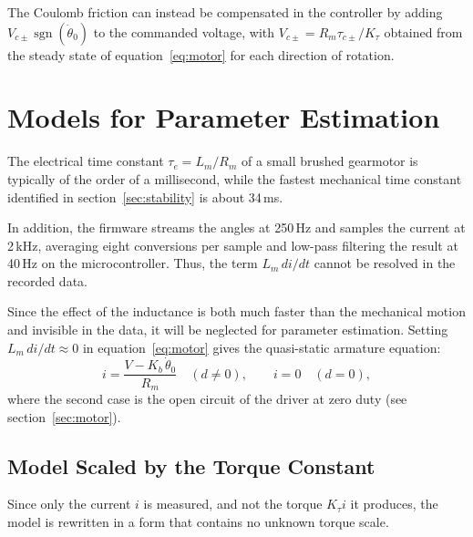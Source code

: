 \documentclass[a4paper,11pt]{article}
\newcommand{\sgn}{\operatorname{sgn}}
\begin{document}
The Coulomb friction can instead be compensated in the controller by adding $V_{c\pm} \sgn(\dot\theta_0)$ to the commanded voltage, with $V_{c\pm} = R_m \tau_{c\pm} / K_\tau$ obtained from the steady state of equation~\ref{eq:motor} for each direction of rotation.

\section{Models for Parameter Estimation}
\label{sec:estmodels}
The electrical time constant $\tau_e = L_m/R_m$ of a small brushed gearmotor is typically of the order of a millisecond, while the fastest mechanical time constant identified in section~\ref{sec:stability} is about 34\,ms.

In addition, the firmware streams the angles at 250\,Hz and samples the current at 2\,kHz, averaging eight conversions per sample and low-pass filtering the result at 40\,Hz on the microcontroller. Thus, the term $L_m\, di/dt$ cannot be resolved in the recorded data.

Since the effect of the inductance is both much faster than the mechanical motion and invisible in the data, it will be neglected for parameter estimation. Setting $L_m\, di/dt \approx 0$ in equation~\ref{eq:motor} gives the quasi-static armature equation:
\begin{equation}
  i = \frac{V - K_b\, \dot\theta_0}{R_m} \quad (d \neq 0), \qquad i = 0 \quad (d = 0),
  \label{eq:qs}
\end{equation}
where the second case is the open circuit of the driver at zero duty (see section~\ref{sec:motor}).

\subsection{Model Scaled by the Torque Constant}
Since only the current $i$ is measured, and not the torque $K_\tau i$ it produces, the model is rewritten in a form that contains no unknown torque scale.
\end{document}
